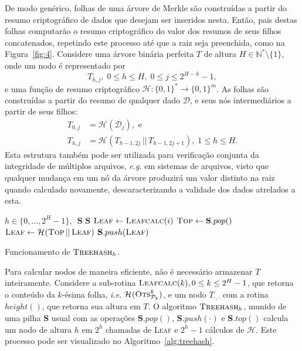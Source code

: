 \documentclass{ufsctex/ufsctex}
\newcommand{\hh}{\mathcal{H}}
\newcommand{\pk}{\mathcal{P}_k}
\newcommand{\hash}[2][]{\mathcal{H}^{#1} (#2)}
\newcommand{\concat}{\, \vert{} \vert{} \,}
\newcommand{\binwds}[1]{\{0, 1\}^{#1}}
\newcommand{\fhash}[1]{\hh{}: \binwds{*} \longrightarrow{} \binwds{#1}}
\begin{document}
De modo genérico, folhas de uma árvore de Merkle são construídas a partir do
resumo criptográfico de dados que desejam ser inseridos nesta. Então, pais
destas folhas computarão o resumo criptográfico do valor dos resumos de seus
filhos concatenados, repetindo este processo até que a raiz seja preenchida,
como na Figura~\ref{fig:4}. Considere uma árvore binária perfeita $T$ de
altura $H \in \mathbb{N}^{*}\setminus\{1\}$, onde um nodo é representado por
\begin{equation}
  T_{h, j}, \; 0 \leq h \leq H, \; 0 \leq j \leq 2^{H - h} - 1,
\end{equation}
e uma função de resumo criptográfico $\fhash{m}$. As folhas são construídas a
partir do resumo de qualquer dado $\mathcal{D}$, e seus nós intermediários a
partir de seus filhos:
\begin{equation}
  \begin{split}
    T_{0, j} &= \hash{\mathcal{D}_j}, \text{ e } \\
    T_{h, j} &= \hash{T_{h - 1, 2j} \concat T_{h - 1, 2j + 1}},
      \; 1 \leq h \leq H.
  \end{split}
\end{equation}
Esta estrutura também pode ser utilizada para verificação conjunta da
integridade de múltiplos arquivos, \emph{e.g.} em sistemas de arquivos, visto
que qualquer mudança em um nó da árvore produzirá um valor distinto na raiz
quando calculado novamente, descaracterizando a validade dos dados atrelados a
esta.

\begin{algorithm}
  \begin{algorithmic}
    \REQUIRE{}  $h \in \{0, \dots, 2^{H} - 1\}, \enspace \mathbf{S}$
    \ENSURE{}  $\mathbf{S}$ 
    \STATE{}  $\textsc{Leaf} \leftarrow \textsc{Leafcalc}(i)$
      \STATE{}  $\textsc{Top} \leftarrow \mathbf{S}.pop()$
      \STATE{}  $\textsc{Leaf} \leftarrow
        \hash{\textsc{Top} \concat \textsc{Leaf}}$
    \ENDWHILE{}
    \STATE{}  $\mathbf{S}.push(\textsc{Leaf})$
  \end{algorithmic}
  \caption{Funcionamento de $\textsc{Treehash}_h$.}\label{alg:treehash}
\end{algorithm}

Para calcular nodos de maneira eficiente, não é necessário armazenar $T$
inteiramente. Considere a sub-rotina $\textsc{Leafcalc}(k), 0 \leq k \leq 2^{H}
- 1$, que retorna o conteúdo da $k$-ésima folha, \emph{i.e.}
$\hash{\textsc{Ots}^{k}_{\pk{}}}$, e um nodo $T_{\cdot, \cdot}$ com a rotina
$height()$, que retorna sua altura em $T$.  O algoritmo $\textsc{Treehash}_h$,
munido de uma pilha \textbf{S} usual com as operações $\mathbf{S}.pop()$,
$\mathbf{S}.push(\cdot)$ e $\mathbf{S}.top()$ calcula um nodo de altura $h$ em
$2^h$ chamadas de \textsc{Leaf} e $2^{h} - 1$ cálculos de $\hh{}$.  Este
processo pode ser visualizado no Algoritmo~\ref{alg:treehash}.
\end{document}
